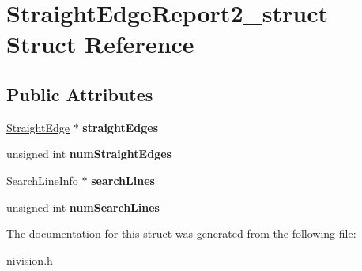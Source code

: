 \hypertarget{structStraightEdgeReport2__struct}{
\section{StraightEdgeReport2\_\-struct Struct Reference}
\label{structStraightEdgeReport2__struct}
}
\subsection*{Public Attributes}
\begin{DoxyCompactItemize}
\item 
\hypertarget{structStraightEdgeReport2__struct_a4d3743465784494b07d848e747596351}{
\hyperlink{structStraightEdge__struct}{StraightEdge} $\ast$ {\bfseries straightEdges}}
\label{structStraightEdgeReport2__struct_a4d3743465784494b07d848e747596351}

\item 
\hypertarget{structStraightEdgeReport2__struct_ada1e539abf1dd770903c5ea9b9f490ad}{
unsigned int {\bfseries numStraightEdges}}
\label{structStraightEdgeReport2__struct_ada1e539abf1dd770903c5ea9b9f490ad}

\item 
\hypertarget{structStraightEdgeReport2__struct_af949a2c45820f1a872f702ec0ec0668a}{
\hyperlink{structSearchLineInfo__struct}{SearchLineInfo} $\ast$ {\bfseries searchLines}}
\label{structStraightEdgeReport2__struct_af949a2c45820f1a872f702ec0ec0668a}

\item 
\hypertarget{structStraightEdgeReport2__struct_a1f533a825332301f5722af5cd89d2f15}{
unsigned int {\bfseries numSearchLines}}
\label{structStraightEdgeReport2__struct_a1f533a825332301f5722af5cd89d2f15}

\end{DoxyCompactItemize}


The documentation for this struct was generated from the following file:\begin{DoxyCompactItemize}
\item 
nivision.h\end{DoxyCompactItemize}
